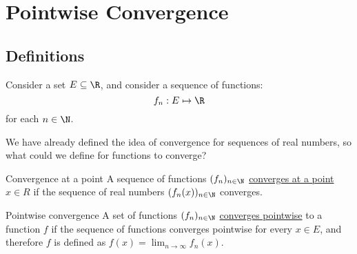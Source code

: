 \documentclass[../Main.tex]{subfiles}
\begin{document}
\section{Pointwise Convergence}
\subsection{Definitions}
Consider a set $E \subseteq \R$, and consider a sequence of functions:
\begin{equation*}
    f_n : E \mapsto \R
\end{equation*}
for each $n \in \N$.

We have already defined the idea of convergence for sequences of real numbers, so what could we define for functions to converge?

\begin{definition}{Convergence at a point}
    A sequence of functions $(f_n)_{n \in \N}$ \underline{converges at a point} $x \in R$ if the sequence of real numbers $(f_n(x))_{n \in \N}$ converges.
\end{definition}
\begin{definition}{Pointwise convergence}
    A set of functions $(f_n)_{n \in \N}$ \underline{converges pointwise} to a function $f$ if the sequence of functions converges pointwise for every $x \in E$, and therefore $f$ is defined as $f(x) = \lim_{n \to \infty} f_n(x)$.
\end{definition}
\end{document}
